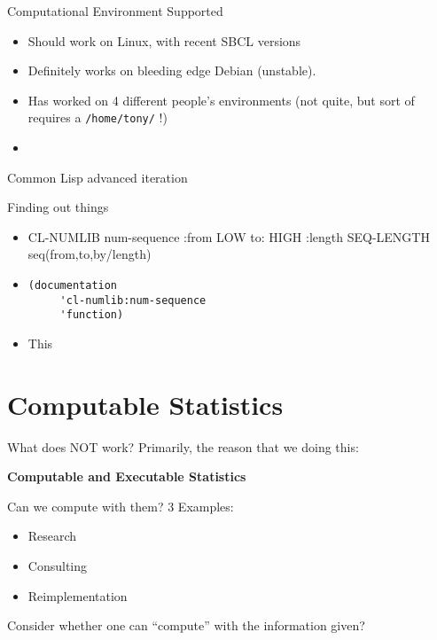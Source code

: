 \documentclass{beamer}
\begin{document}
\begin{frame}[fragile]{Computational Environment Supported}
  \begin{itemize}
  \item Should  work on Linux, with recent SBCL versions
  \item Definitely works on bleeding edge Debian (unstable).
  \item Has worked on 4 different people's environments (not quite,
    but sort of requires a \verb+/home/tony/+ !)
  \item 
  \end{itemize}
\end{frame}

\begin{frame}{Common Lisp}
  advanced iteration
\end{frame}


\begin{frame}[fragile]{Finding out things}
  \begin{itemize}
  \item CL-NUMLIB
     num-sequence :from LOW to: HIGH :length SEQ-LENGTH 
     seq(from,to,by/length)
   \item
\begin{verbatim}
(documentation
     'cl-numlib:num-sequence
     'function)
\end{verbatim}
   \item This
  \end{itemize}
\end{frame}


\section{Computable Statistics}

\begin{frame}{What does NOT work?}
  Primarily, the reason that we doing this:
  
  \textbf{Computable and Executable Statistics}
\end{frame}

\begin{frame}{Can we compute with them?}
  3 Examples:
  \begin{itemize}
  \item Research
  \item Consulting
  \item Reimplementation
  \end{itemize}
  Consider whether one can ``compute'' with the information given?
\end{frame}
\end{document}
